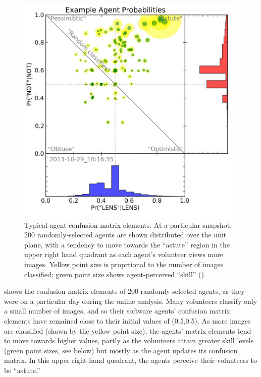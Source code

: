 \documentclass[useAMS,usenatbib,a4paper]{mn2e}
\begin{document}
\begin{figure}
\centering\includegraphics[width=0.9\linewidth]{CFHTLS_2013-10-29_101635_probabilities.pdf}
\caption{Typical \SW agent confusion matrix elements. At a particular
snapshot, 200 randomly-selected agents are shown distributed over the unit plane, with a
tendency to move towards the ``astute'' region in the upper right hand
quadrant as each agent's volunteer views more images. Yellow point size is
proprtional to the number of images classified; green point size shows
agent-perceived ``skill'' ().}
\label{fig:swap:agent-probabilities}
\end{figure}

 shows the confusion matrix elements of 200
randomly-selected agents, as they were on a particular day during the
\StageOne online analysis. Many volunteers classify  only a small number of images, and
so their software agents' confusion matrix elements have remained close to their initial values
of (0.5,0.5). As more images are classified (shown by the yellow point size),
the agents' matrix elements tend to move towards higher values, partly as the
volunteers attain greater skill levels (green point sizes, see
 below) but mostly as
the agent updates its confusion matrix. In this upper
right-hand quadrant, the agents perceive their volunteers to be ``astute.''
\end{document}

